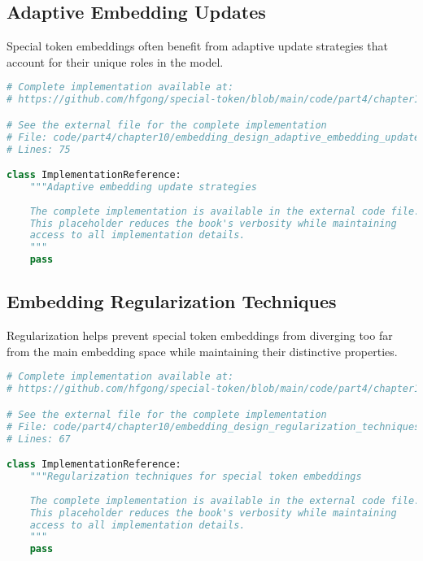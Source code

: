 \subsection{Adaptive Embedding Updates}

Special token embeddings often benefit from adaptive update strategies that account for their unique roles in the model.
\begin{comment}
Feedback: Explaining the "why" is important here. For example: "Special tokens often have very different learning dynamics than content tokens. A [CLS] token, for instance, receives gradients from the entire sequence, while a rare custom token might receive very few updates. An adaptive strategy, such as using a **separate, higher learning rate** for the special token embeddings, can help them learn their function more quickly without destabilizing the rest of the model, which is trained with a lower learning rate."
\end{comment}

\begin{lstlisting}[language=Python, caption={Adaptive embedding update strategies}]
# Complete implementation available at:
# https://github.com/hfgong/special-token/blob/main/code/part4/chapter10/embedding_design_adaptive_embedding_update_stra.py

# See the external file for the complete implementation
# File: code/part4/chapter10/embedding_design_adaptive_embedding_update_stra.py
# Lines: 75

class ImplementationReference:
    """Adaptive embedding update strategies
    
    The complete implementation is available in the external code file.
    This placeholder reduces the book's verbosity while maintaining
    access to all implementation details.
    """
    pass
\end{lstlisting}

\subsection{Embedding Regularization Techniques}

Regularization helps prevent special token embeddings from diverging too far from the main embedding space while maintaining their distinctive properties.

\begin{lstlisting}[language=Python, caption={Regularization techniques for special token embeddings}]
# Complete implementation available at:
# https://github.com/hfgong/special-token/blob/main/code/part4/chapter10/embedding_design_regularization_techniques_for_.py

# See the external file for the complete implementation
# File: code/part4/chapter10/embedding_design_regularization_techniques_for_.py
# Lines: 67

class ImplementationReference:
    """Regularization techniques for special token embeddings
    
    The complete implementation is available in the external code file.
    This placeholder reduces the book's verbosity while maintaining
    access to all implementation details.
    """
    pass
\end{lstlisting}


